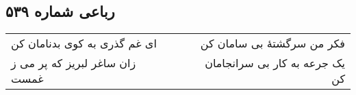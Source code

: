 \begin{center}
\section*{رباعی شماره ۵۳۹}
\label{sec:sh539}
\begin{longtable}{l p{0.5cm} r}
ای غم گذری به کوی بدنامان کن
&&
فکر من سرگشتهٔ بی سامان کن
\\
زان ساغر لبریز که پر می ز غمست
&&
یک جرعه به کار بی سرانجامان کن
\\
\end{longtable}
\end{center}
